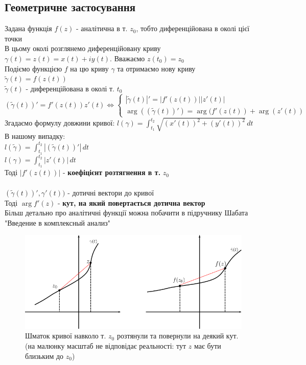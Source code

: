 \documentclass[a4paper, 14pt]{extarticle}
\def\hugespace{\vspace{5mm} \\}
\begin{document}
	\subsection{Геометричне застосування}
	Задана функція $f(z)$ - аналітична в т. $z_0$, тобто диференційована в околі цієї точки\\
	В цьому околі розглянемо диференційовану криву \\ $\gamma(t) = z(t) = x(t)+iy(t)$. Вважаємо $z(t_0) = z_0$\\
	Подіємо функцією $f$ на цю криву $\gamma$ та отримаємо нову криву \\ $\tilde{\gamma}(t) = f(z(t))$\\
	$\tilde{\gamma}(t)$ - диференційована в околі т. $t_0$\\
	$(\tilde{\gamma}(t))' = f'(z(t))z'(t) \iff
	\begin{cases}
	|\tilde{\gamma}(t)|' = |f'(z(t))||z'(t)| \\
	\arg ((\tilde{\gamma}(t))') = \arg(f'(z(t)) + \arg(z'(t))
	\end{cases}
	$\\
	Згадаємо формулу довжини кривої: $l(\gamma) = \displaystyle \int_{t_1}^{t_2} \sqrt{(x'(t))^2 +(y'(t))^2}\,dt$\\
	В нашому випадку: \\ 
	$l(\tilde{\gamma}) = \displaystyle \int_{t_1}^{t_2} |(\tilde{\gamma}(t))'|\,dt$\\
	$l(\gamma) = \displaystyle \int_{t_1}^{t_2} |z'(t)|\,dt$\\
	Тоді $|f'(z(t))|$ - \textbf{коефіцієнт розтягнення в т.} $z_0$\\
	\\
	$(\tilde{\gamma}(t))', \gamma'(t))$ - дотичні вектори до кривої\\
	Тоді $\arg f'(z)$ - \textbf{кут, на який повертається дотична вектор}
	\hugespace
	Більш детально про аналітичні функції можна побачити в підручнику Шабата "Введение в комплексный анализ"
	\begin{figure}[h]
	\captionsetup{justification=centering}
	\centerline{\includegraphics[scale = 1]{geom sense.png}}
	\caption{Шматок кривої навколо т. $z_0$ розтянули та повернули на деякий кут. (на малюнку масштаб не відповідає реальності: тут $z$ має бути близьким до $z_0$)}
	\end{figure}
	
\end{document}
